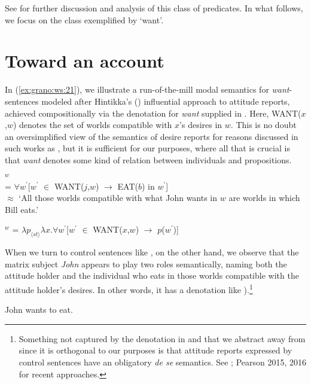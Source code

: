 \documentclass[output=paper,modfonts,nonflat]{langsci/langscibook}
\newcommand{\á}{\'{ã}}
\newcommand{\É}{\'{\~{ε}}}
\newcommand{\È}{\`{\~{ε}}}
\newcommand{\í}{\'{\~{i}}}
\newcommand{\ì}{\`{\~{i}}}
\newcommand{\Ó}{\'{\~{ɔ}}}
\newcommand{\Ò}{\`{\~{ɔ}}}
\newcommand{\ú}{\'{ũ}}
\newcommand{\ù}{\`{ũ}}
\begin{document}
\noindent See \cite{GranoToappear} for further discussion and analysis of this class of predicates. In what follows, we focus on the class exemplified by `want'.



\section{Toward an account}
\label{sec:Grano:TowardAccount:4}

In  (\ref{ex:grano:ws:21}), we illustrate a run-of-the-mill modal semantics for \emph{want}-sentences modeled after Hintikka's (\citeyear{Hintikk1969}) influential approach to attitude reports, achieved compositionally via the denotation for \emph{want} supplied in . Here, WANT($x$,$w$) denotes the set of worlds compatible with $x$'s desires in $w$. This is no doubt an oversimplified view of the semantics of desire reports for reasons discussed in such works as \cite{Heim1992}, but it is sufficient for our purposes, where all that is crucial is that \emph{want} denotes some kind of relation between individuals and propositions.


\ea 
{}$^{w}$\\ = $\forall w^{\prime}$[$w^{\prime}$ $\in$ WANT($j$,$w$) $\rightarrow$ EAT($b$) in $w^{\prime}$]\\
$\approx$ `All those worlds compatible with what John wants in $w$ are worlds in which Bill eats.' \label{ex:grano:ws:21}
\z

\ea 
{}$^{w}$ = $\lambda p_{\langle st\rangle}\lambda x.\forall w^{\prime}$[$w^{\prime}$ $\in$ WANT($x$,$w$) $\rightarrow$ $p$($w^{\prime}$)] \label{ex:grano:w:22}
\z

When we turn to control sentences like , on the other hand, we observe that the matrix subject \emph{John} appears to play two roles semantically, naming both the attitude holder and the individual who eats in those worlds compatible with the attitude holder's desires. In other words, it has a denotation like ).\footnote{Something not captured by the denotation in  and that we abstract away from since it is orthogonal to our purposes is that attitude reports expressed by control sentences have an obligatory \emph{de se} semantics. See ; Pearson 2015, 2016 for recent approaches.\nocite{stephenson10, Pearson2015, Pearson16}}

\ea 
John wants to eat. \label{ex:grano:wcs2:23}
\z
\end{document}
